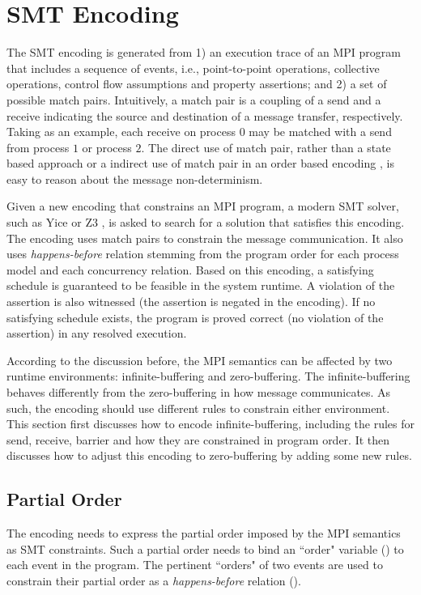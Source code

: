 \section{SMT Encoding}
The SMT encoding is generated from 1) an execution trace of an MPI program that includes a sequence of events, i.e., point-to-point operations, collective operations, control flow assumptions and property assertions; and 2) a set of possible match pairs. Intuitively, a match pair is a coupling of a send and a receive indicating the source and destination of a message transfer, respectively. Taking  as an example, each receive on process $0$ may be matched with a send from process $1$ or process $2$. The direct use of match pair, rather than a state based approach \cite{} or a indirect use of match pair in an order based encoding \cite{}, is easy to reason about the message non-determinism. 

Given a new encoding that constrains an MPI program, a modern SMT solver, such as Yice \cite{} or Z3 \cite{}, is asked to search for a solution that satisfies this encoding. The encoding uses match pairs to constrain the message communication. It also uses \textit{happens-before} relation stemming from the program order for each process model and each concurrency relation. Based on this encoding, a satisfying schedule is guaranteed to be feasible in the system runtime. A violation of the assertion is also witnessed (the assertion is negated in the encoding). If no satisfying schedule exists, the program is proved correct (no violation of the assertion) in any resolved execution. 

According to the discussion before, the MPI semantics can be affected by two runtime environments: infinite-buffering and zero-buffering. The infinite-buffering behaves differently from the zero-buffering in how message communicates. As such, the encoding should use different rules to constrain either environment. This section first discusses how to encode infinite-buffering, including the rules for send, receive, barrier and how they are constrained in program order. It then discusses how to adjust this encoding to zero-buffering by adding some new rules.

\subsection{Partial Order}
The encoding needs to express the partial order imposed by the MPI semantics as SMT constraints. Such a partial order needs to bind an ``order" variable () to each event in the program. The pertinent ``orders" of two events are used to constrain their partial order as a \emph{happens-before} relation ().

